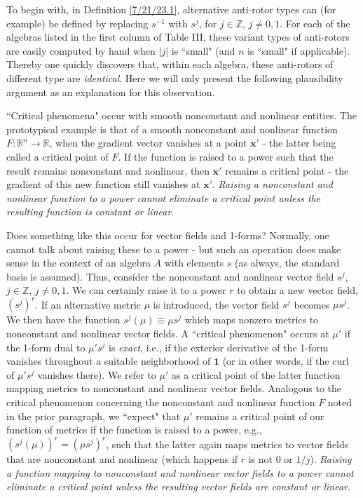 \documentclass{amsart}
\numberwithin{equation}{section}
\theoremstyle{definition}
\numberwithin{theorem}{section}
\begin{document}
  To begin with, in Definition \ref{7/21/23.1}, alternative anti-rotor types can (for example) be defined by replacing $s^{-1}$ with $s^j$, for $j\in\mathbb{Z}$, $j\ne 0,1$.  For each of the algebras listed in the first column of Table III, these variant types of anti-rotors are easily computed by hand when  $|j|$ is ``small" (and $n$ is ``small" if applicable).  
Thereby one quickly discovers that, within each algebra, these anti-rotors of different type are {\it identical}.  
Here we will only present the following plausibility argument as an explanation for this observation.

``Critical phenomena" occur with smooth nonconstant and nonlinear entities.  The prototypical example is that of a smooth nonconstant and nonlinear function $F:\mathbb{R}^n\rightarrow \mathbb{R}$, when the gradient vector vanishes at a point $\mathbf{x'}$ - the latter being called a critical point of $F$.  If the function is raised to a power such that the result remains nonconstant and nonlinear, then $\mathbf{x'}$ remains a critical point - the gradient of this new function still vanishes at $\mathbf{x'}$.   {\it Raising a nonconstant and nonlinear function to a power cannot eliminate a critical point unless the resulting function is constant or linear}.  

Does something like this occur for vector fields and 1-forms?  Normally, one cannot talk about raising these to a power - but such an operation does make sense in the context of an algebra $A$ with elements $s$ (as always, the standard basis is assumed).  Thus, consider the nonconstant and nonlinear vector field $s^j$, $j\in \mathbb{Z}$, \mbox{$j\ne 0,1$}. We can certainly raise it to a power $r$ to obtain a new vector field, $(s^j)^r$.  If an alternative metric $\mu$ is introduced, the vector field $s^j$ becomes $\mu s^j$.  We then have the function $s^j(\mu)\equiv \mu s^j$ which maps nonzero metrics to nonconstant and nonlinear vector fields.  A ``critical phenomenon" occurs at $\mu'$ if the 1-form dual to $\mu' s^j$ is {\it exact}, i.e., if the exterior derivative of the 1-form vanishes throughout a suitable neighborhood of $\mathbf{1}$ (or in other words, if the curl of $\mu' s^j$ vanishes there).  We refer to $\mu'$ as a critical point of the latter function mapping metrics to nonconstant and nonlinear vector fields.  Analogous to the critical phenomenon concerning the nonconstant and nonlinear function $F$ noted in the prior paragraph, we ``expect" that $\mu'$ remains a critical point of our function of metrics if the function is raised to a power, e.g., $\left(s^j(\mu)\right)^r = (\mu s^j)^r$, such that the latter again maps metrics to vector fields that are nonconstant and nonlinear (which happens if $r$ is not 0 or $1/j$).  {\it Raising a function mapping to nonconstant and nonlinear vector fields to a power cannot eliminate a critical point unless the resulting vector fields are constant or linear}.   
\end{document}

